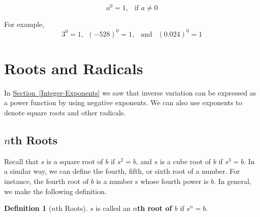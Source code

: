 \documentclass[10pt,]{book}
\newcommand{\terminology}[1]{\textbf{#1}}
\theoremstyle{plain}
\theoremstyle{definition}
\newtheorem{definition}[theorem]{Definition}
\theoremstyle{definition}
\theoremstyle{definition}
\theoremstyle{definition}
\theoremstyle{definition}
\numberwithin{equation}{section}
\begin{document}
\paragraph[]{}\label{paragraphs-47}
\begin{equation*}a^0 = 1, ~~ \text{ if } a \ne 0\end{equation*}\par

    For example,
    \begin{equation*}3^0 = 1, ~~ (−528)^0 = 1, ~~ \text{ and } ~~ (0.024)^0 = 1\end{equation*}
%
\typeout{************************************************}
\typeout{************************************************}
\section[Roots and Radicals]{Roots and Radicals}\label{Roots-and-Radicals}

    In \hyperref[Integer-Exponents]{Section~\ref{Integer-Exponents}} we saw that inverse variation can be expressed as a power function by using negative exponents. We can also use exponents to denote square roots and other radicals.
%
\typeout{************************************************}
\typeout{************************************************}
\subsection[\(n\)th Roots]{\(n\)th Roots}\label{subsection-67}
\index{}
    Recall that \(s\) is a square root of \(b\) if \(s^2 = b\), and \(s\) is a cube root of \(b\) if \(s^3 = b\). In a similar way, we can define the fourth, fifth, or sixth root of a number. For instance, the fourth root of \(b\) is a number s whose fourth power is \(b\). In general, we make the following definition.
%
\begin{definition}[\(n\)th Roots]\label{definition-4}
%
\(s\) is called an \terminology{ \(n\)th root of \(b\)} if \(s^n = b\).
\end{definition}
\par
\end{document}
